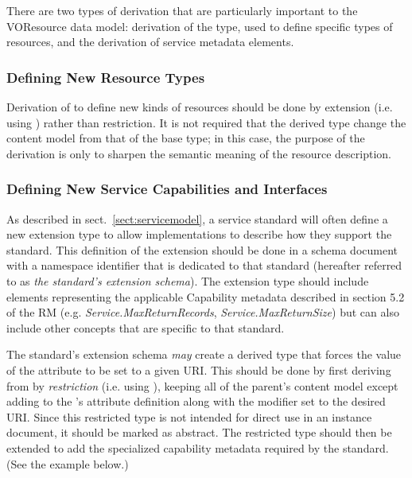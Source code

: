 \documentclass[11pt,a4paper]{ivoa}
\begin{document}
There are two types of derivation that are particularly important to
the VOResource data model:  derivation of the 
type, used to define specific types of resources, and the derivation
of service metadata elements.  


\subsubsection{Defining New Resource Types}
\label{sect:definingresourcetypes}


Derivation of  to define new kinds of
resources should be done by extension (i.e. using 
) rather than restriction.  It is
not required that the derived type change the content model from that
of the  base type; in this case, the purpose
of the derivation is only to sharpen the semantic meaning of the
resource description.  


\subsubsection{Defining New Service Capabilities and Interfaces}
\label{sect:serviceelements}


As described in sect.~\ref{sect:servicemodel}, a service
standard will often define a new  extension
type to allow implementations to describe how they support the
standard.  This definition of the  extension
should be done in a schema document with a namespace identifier that
is dedicated to that standard (hereafter referred to as \emph{the
standard's extension schema}).  The extension type should include
elements representing the applicable Capability metadata described in
section 5.2 of the RM
(e.g. \emph{Service.MaxReturnRecords}, \emph{Service.MaxReturnSize})
but can also include other concepts that are specific to that standard.



The standard's extension schema \emph{may} create a derived
 type that forces the value of the
 attribute to be set to a given URI.  This
should be done by first deriving from  by
\emph{restriction} (i.e. using
), keeping all of the parent's
content model except adding to the 's attribute
definition  along with the
 modifier set to the desired URI.  Since this
restricted type is not intended for direct use in an instance
document, it should be marked as abstract.  The restricted type should
then be extended to add the specialized capability metadata required
by the standard.  (See the example below.)  
\end{document}
